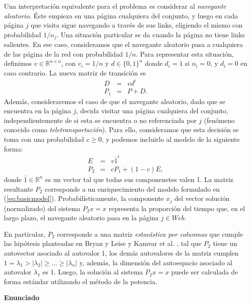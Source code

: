 Una interpretaci\'on equivalente para el problema es considerar al \emph{navegante aleatorio}. \'Este empieza en una
p\'agina cualquiera del conjunto, y luego en cada p\'agina $j$ que visita sigue navegando a trav\'es de sus links,
eligiendo el mismo con probabilidad $1/n_j$. Una situaci\'on particular se da cuando la p\'agina no tiene links salientes. En
ese caso, consideramos que el navegante aleatorio pasa a cualquiera de las p\'agina de la red con probabilidad $1/n$.
Para representar esta situaci\'on, definimos $v \in \mathbb{R}^{n \times n}$, con $v_i = 1/n$ y $d \in \{0,1\}^{n}$ donde 
$d_i = 1$ si $n_i = 0$, y $d_i = 0$ en caso contrario. La nueva matriz de transici\'on es 
\begin{eqnarray*}
D & = & v d^t \\
P_1 & = & P + D.
\end{eqnarray*}
Adem\'as, consideraremos el caso de que el navegante aleatorio, dado que se encuentra en la p\'agina $j$, decida visitar
una p\'agina cualquiera del conjunto, independientemente de si esta se encuentra o no referenciada por $j$ (fen\'omeno
conocido como \emph{teletransportaci\'on}). Para ello, consideramos que esta decisi\'on se toma con una probabilidad
$c \ge 0$, y podemos incluirlo al modelo de la siguiente forma:
\begin{eqnarray*}
E & = & v \bar{1}^t \\
P_2 & = & cP_1 + (1-c)E,
\end{eqnarray*}
\noindent donde $\bar{1} \in \mathbb{R}^n$ es un vector tal que todas sus componenetes valen 1. La matriz resultante
$P_2$ corresponde a un enriquecimiento del modelo formulado en (\ref{eq:basicmodel}). Probabil\'isticamente, la
componente $x_j$ del vector soluci\'on (normalizado) del sistema $P_2 x = x$ representa la proporci\'on del tiempo que,
en el largo plazo, el navegante aleatorio pasa en la p\'agina $j \in Web$.

En particular, $P_2$ corresponde a una
matriz \emph{estoc\'astica por columnas} que cumple las hip\'otesis planteadas en Bryan y Leise \cite{Bryan2006} y
Kamvar et al. \cite{Kamvar2003}, tal que $P_2$ tiene un autovector asociado al autovalor 1, los dem\'as autovalores de
la matriz cumplen $1 = \lambda_1 > |\lambda_2| \ge \dots \ge |\lambda_n|$ y, adem\'as, la dimensi\'on
del autoespacio asociado al autovalor $\lambda_1$ es 1. Luego, la soluci\'on al sistema $P_2 x = x$ puede ser calculada
de forma est\'andar utilizando el m\'etodo de la potencia.

\textbf{Enunciado}

